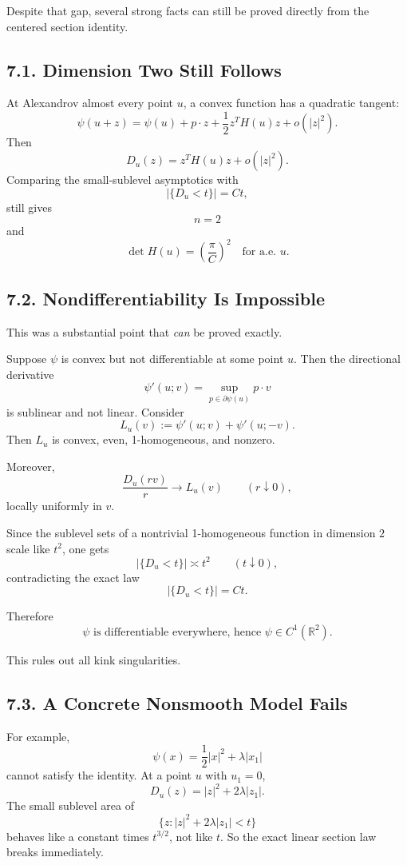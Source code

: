 \documentclass[11pt]{article}
\begin{document}
Despite that gap, several strong facts can still be proved directly from the centered section identity.

\subsection*{7.1. Dimension Two Still Follows}

At Alexandrov almost every point $u$, a convex function has a quadratic tangent:
\[
\psi(u+z)=\psi(u)+p\cdot z+\frac12 z^T H(u)z+o(|z|^2).
\]
Then
\[
D_u(z)=z^TH(u)z+o(|z|^2).
\]
Comparing the small-sublevel asymptotics with
\[
|\{D_u<t\}|=Ct,
\]
still gives
\[
n=2
\]
and
\[
\det H(u)=\left(\frac{\pi}{C}\right)^2
\quad\text{for a.e. }u.
\]

\subsection*{7.2. Nondifferentiability Is Impossible}

This was a substantial point that \emph{can} be proved exactly.

Suppose $\psi$ is convex but not differentiable at some point $u$. Then the directional derivative
\[
\psi'(u;v)=\sup_{p\in \partial\psi(u)} p\cdot v
\]
is sublinear and not linear. Consider
\[
L_u(v):=\psi'(u;v)+\psi'(u;-v).
\]
Then $L_u$ is convex, even, 1-homogeneous, and nonzero.

Moreover,
\[
\frac{D_u(rv)}{r}\to L_u(v)
\qquad(r\downarrow 0),
\]
locally uniformly in $v$.

Since the sublevel sets of a nontrivial 1-homogeneous function in dimension $2$ scale like $t^2$, one gets
\[
|\{D_u<t\}| \asymp t^2
\qquad(t\downarrow 0),
\]
contradicting the exact law
\[
|\{D_u<t\}|=Ct.
\]

Therefore
\[
\boxed{\psi \text{ is differentiable everywhere, hence } \psi\in C^1(\mathbb{R}^2).}
\]

This rules out all kink singularities.

\subsection*{7.3. A Concrete Nonsmooth Model Fails}

For example,
\[
\psi(x)=\frac12|x|^2+\lambda |x_1|
\]
cannot satisfy the identity. At a point $u$ with $u_1=0$,
\[
D_u(z)=|z|^2+2\lambda |z_1|.
\]
The small sublevel area of
\[
\{z: |z|^2+2\lambda |z_1|<t\}
\]
behaves like a constant times $t^{3/2}$, not like $t$. So the exact linear section law breaks immediately.
\end{document}
